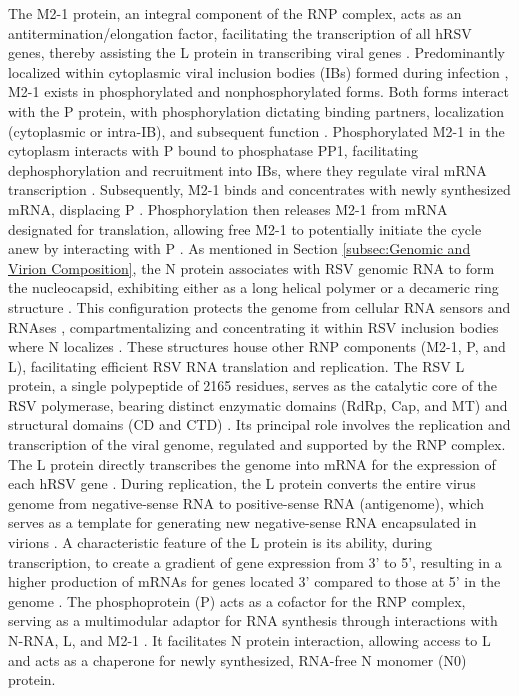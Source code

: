 The M2-1 protein, an integral component of the RNP complex, acts as an antitermination/elongation factor, facilitating the transcription of all hRSV genes, thereby assisting the L protein in transcribing viral genes \cite{Collins1996TranscriptionVirus., Noton2015InitiationReplication}. Predominantly localized within cytoplasmic viral inclusion bodies (IBs) formed during infection \cite{Rincheval2017FunctionalVirus}, M2-1 exists in phosphorylated and nonphosphorylated forms. Both forms interact with the P protein, with phosphorylation dictating binding partners, localization (cytoplasmic or intra-IB), and subsequent function \cite{Richard2018RSVTranscription}. Phosphorylated M2-1 in the cytoplasm interacts with P bound to phosphatase PP1, facilitating dephosphorylation and recruitment into IBs, where they regulate viral mRNA transcription \cite{Richard2018RSVTranscription}. Subsequently, M2-1 binds and concentrates with newly synthesized mRNA, displacing P \cite{Blondot2012StructureProtein.}. Phosphorylation then releases M2-1 from mRNA designated for translation, allowing free M2-1 to potentially initiate the cycle anew by interacting with P \cite{Richard2018RSVTranscription}. As mentioned in Section \ref{subsec:Genomic and Virion Composition}, the N protein associates with RSV genomic RNA to form the nucleocapsid, exhibiting either as a long helical polymer or a decameric ring structure \cite{Gonnin2023StructuralNucleocapsids}. This configuration protects the genome from cellular RNA sensors and RNAses \cite{Tawar2009CrystalVirus}, compartmentalizing and concentrating it within RSV inclusion bodies where N localizes \cite{Rincheval2017FunctionalVirus}. These structures house other RNP components (M2-1, P, and L), facilitating efficient RSV RNA translation and replication. The RSV L protein, a single polypeptide of 2165 residues, serves as the catalytic core of the RSV polymerase, bearing distinct enzymatic domains (RdRp, Cap, and MT) and structural domains (CD and CTD) \cite{Gilman2019StructureComplex, Cao2020Cryo-EMPolymerase}. Its principal role involves the replication and transcription of the viral genome, regulated and supported by the RNP complex. The L protein directly transcribes the genome into mRNA for the expression of each hRSV gene \cite{Cowton2006UnravellingSynthesis, Noton2015InitiationReplication}. During replication, the L protein converts the entire virus genome from negative-sense RNA to positive-sense RNA (antigenome), which serves as a template for generating new negative-sense RNA encapsulated in virions \cite{Cowton2006UnravellingSynthesis, Fearns2000FunctionalVirus}. A characteristic feature of the L protein is its ability, during transcription, to create a gradient of gene expression from 3' to 5', resulting in a higher production of mRNAs for genes located 3' compared to those at 5' in the genome \cite{Hardy1998TheTranscription, Kuo1996TheMinigenome}. The phosphoprotein (P) acts as a cofactor for the RNP complex, serving as a multimodular adaptor for RNA synthesis through interactions with N-RNA, L, and M2-1 \cite{Blondot2012StructureProtein., Cardone2021APhosphoprotein}. It facilitates N protein interaction, allowing access to L \cite{Sourimant2015FinePhosphoprotein} and acts as a chaperone for newly synthesized, RNA-free N monomer (N0) protein. 